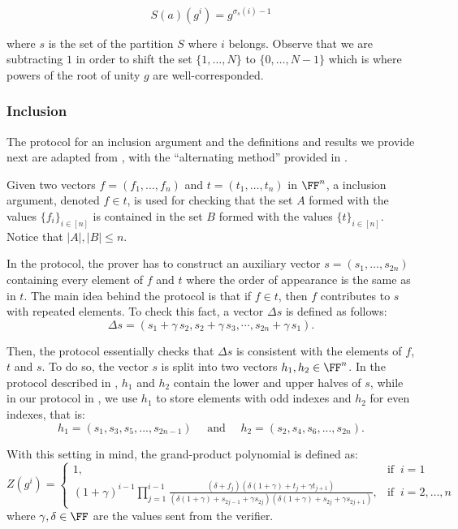 \[
S(a)(g^i) = g^{\sigma_s(i) - 1}
\]

where $s$ is the set of the partition $S$ where $i$ belongs. Observe that we are subtracting $1$ in order to shift the set $\{1, \dots, N\}$ to $\{0, \dots, N-1\}$ which is where powers of the root of unity $g$ are well-corresponded. 


\subsubsection*{Inclusion}

The protocol for an inclusion argument and the definitions and results we provide next are adapted from \cite{EPRINT:GabWil20}, with the ``alternating method''  provided in \cite{EPRINT:PFMBM22}.

Given two vectors $f = (f_1, \dots, f_n)$ and $t = (t_1, \dots, t_n)$ in $\FF^n$, a inclusion argument, denoted $f \in t$, is used for checking that the set $A$ formed with the values $\{f_i\}_{i\in[n]}$ is contained in the set $B$ formed with the values $\{t\}_{i\in[n]}$. Notice that $|A|,|B|\leq n$.

In the protocol, the prover has to construct an auxiliary vector $s = (s_1, \dots, s_{2n})$ containing every element of $f$ and $t$ where the order of appearance is the same as in $t$.
The main idea behind the protocol is that if $f \in t$, then $f$ contributes to $s$ with repeated elements.
To check this fact, a vector $\Delta{s}$ is defined as follows:
\[
\Delta{s} = (s_1+\gamma\,s_2, s_2+\gamma\,s_3, \cdots, s_{2n}+\gamma\,s_1).
\]

Then, the protocol essentially checks that $\Delta{s}$ is consistent with the elements of $f$, $t$ and $s$.
To do so, the vector $s$ is split into two vectors $h_1,h_2 \in \FF^n$.
In the protocol described in \cite{EPRINT:GabWil20},
$h_1$ and $h_2$ contain the lower and upper halves of $s$, while in our protocol in \cite{EPRINT:PFMBM22}, we use $h_1$ to store elements with odd indexes and $h_2$ for even indexes, that is:
\begin{equation}\label{eq:alternating-method}
h_1 = (s_1, s_3, s_5, ..., s_{2n-1}) \quad\text{ and }\quad
h_2 = (s_2, s_4, s_6, ..., s_{2n}).
\end{equation}

With this setting in mind, the grand-product polynomial is defined as:
\[
  Z(g^i) = 
  \begin{cases} 
  1, & \text{if }~ i=1 \\ 
  \displaystyle (1+\gamma)^{i-1}\prod_{j=1}^{i-1}\frac{{(\delta + f_j)}   (\delta(1+\gamma) + t_j + \gamma t_{j+1})}{ (\delta(1+\gamma) + s_{2j-1} + \gamma s_{2j})(\delta(1+\gamma) + s_{2j} + \gamma s_{2j+1})}, & \text{if }~ i = 2, \dots, n
  \end{cases} 
\]
where $\gamma,\delta \in \FF$ are the values sent from the verifier.


